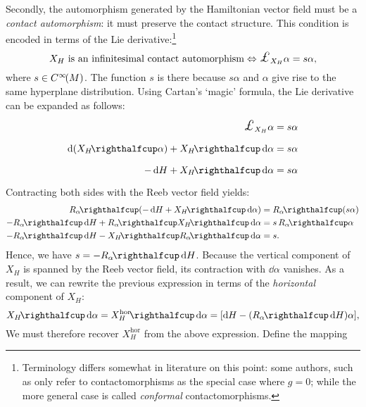 Secondly, the automorphism generated by the Hamiltonian vector field must be a \emph{contact automorphism}: it must preserve the contact structure. This condition is encoded in terms of the Lie derivative:\footnote
{Terminology differs somewhat in literature on this point: some authors, such as \citet{DeLeon2020} only refer to contactomorphisms as the special case where $g = 0$; while the more general case is called \emph{conformal} contactomorphisms.}
$$ X_H \text{ is an infinitesimal contact automorphism} \Leftrightarrow \lied{X_H}{\alpha} = s\alpha, $$
where $s \in C^\infty\!\qty(M)$. The function $s$ is there because $s \alpha $ and $\alpha$ give rise to the same hyperplane distribution. 
Using Cartan's `magic' formula, the Lie derivative can be expanded as follows:
\begin{equation*}
    \begin{split}
        \lied{X_H}{\alpha} &= s \alpha\\
        \dd{\qty(\intpr{X_H}{\alpha})} + \intpr{X_H}{\dd{\alpha}} &= s\alpha \\
        -\dd{H} + \intpr{X_H}{\dd{\alpha}} &= s\alpha \\
    \end{split}
\end{equation*}
Contracting both sides with the Reeb vector field yields:
\begin{equation*}
    \begin{split}
        \intpr{R_\alpha}{\qty(-\dd{H} + \intpr{X_H}{\dd{\alpha}})} &= \intpr{R_\alpha}{\qty(s\alpha)} \\
        -\intpr{R_\alpha}{\dd{H}} + \intpr{R_\alpha}{\intpr{X_H}{\dd{\alpha}}} &= s\,\intpr{R_\alpha}{\alpha} \\
        -\intpr{R_\alpha}{\dd{H}} - \intpr{X_H}{\intpr{R_\alpha}{\dd{\alpha}}} &= s.
    \end{split}
\end{equation*}
Hence, we have $s = -\intpr{R_\alpha}{\dd{H}}$. Because the vertical component of $X_H$ is spanned by the Reeb vector field, its contraction with $\dd{\alpha}$ vanishes. As a result, we can rewrite the previous expression in terms of the \emph{horizontal} component of $X_H$:
\begin{equation}
    \intpr{X_H}{\dd{\alpha}} = \intpr{X_H^\text{hor}}{\dd{\alpha}}=  \qty[\dd{H} - \qty(\intpr{R_\alpha}{\dd{H}})\alpha], 
    \label{eq:basic_form}
\end{equation}
We must therefore recover $X^\text{hor}_H$ from the above expression. Define the mapping  

